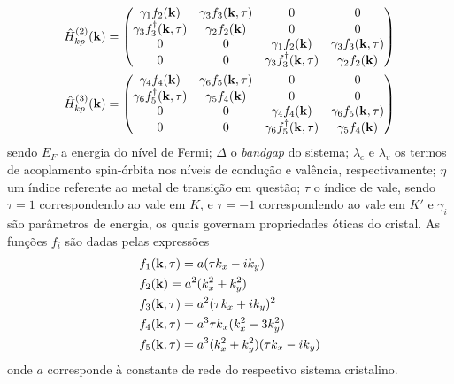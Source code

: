 \begin{align}
\begin{split}
    & \hat{H}_{kp}^{(2)}(\mathbf{k}) =
    \left(
    \begin{matrix}
        \gamma_1 f_2(\mathbf{k})                & \gamma_3 f_3(\mathbf{k},\tau) & 0                                     & 0                           \\
        \gamma_3 f_3^{\dagger}(\mathbf{k},\tau) & \gamma_2 f_2(\mathbf{k})      & 0                                     & 0                           \\
        0                                     & 0                           & \gamma_1 f_2(\mathbf{k})                & \gamma_3 f_3(\mathbf{k},\tau) \\
        0                                     & 0                           & \gamma_3 f_3^{\dagger}(\mathbf{k},\tau) & \gamma_2 f_2(\mathbf{k})      \\
      \end{matrix}
    \right) \\
    &\hat{H}_{kp}^{(3)}(\mathbf{k}) =
    \left(
    \begin{matrix}
        \gamma_4 f_4(\mathbf{k})                & \gamma_6 f_5(\mathbf{k},\tau) & 0                                     & 0                           \\
        \gamma_6 f_5^{\dagger}(\mathbf{k},\tau) & \gamma_5 f_4(\mathbf{k})      & 0                                     & 0                           \\
        0                                     & 0                           & \gamma_4 f_4(\mathbf{k})                & \gamma_6 f_5(\mathbf{k},\tau) \\
        0                                     & 0                           & \gamma_6 f_5^{\dagger}(\mathbf{k},\tau) & \gamma_5 f_4(\mathbf{k})      \\
      \end{matrix}
    \right)
  \end{split}
\end{align}
sendo $E_F$ a energia do nível de Fermi; $\Delta$ o \textit{bandgap} do sistema;
$\lambda_c$ e $\lambda_v$ os termos de acoplamento spin-órbita nos níveis de
condução e valência, respectivamente; $\eta$ um índice referente ao metal de
transição em questão; $\tau$ o índice de vale, sendo $ \tau = 1 $ correspondendo
ao vale em $K$, e $ \tau = -1 $ correspondendo ao vale em $K'$ e $ \gamma_i $
são parâmetros de energia, os quais governam propriedades óticas do cristal. 
As funções $f_i$ são dadas pelas expressões
\begin{align}
  \begin{split}
    & f_1(\mathbf{k},\tau) = a(\tau k_x - i k_y)                    \\
    & f_2(\mathbf{k}) = a^2(k_x^2 + k_y^2)                          \\
    & f_3(\mathbf{k},\tau) = a^2(\tau k_x + i k_y)^2                \\
    & f_4(\mathbf{k},\tau) = a^3 \tau k_x (k_x^2 - 3 k_y^2)         \\
    & f_5(\mathbf{k},\tau) = a^3 (k_x^2 + k_y^2) (\tau k_x - i k_y)
  \end{split}
\end{align}
onde $a$ corresponde à constante de rede do respectivo sistema cristalino.

